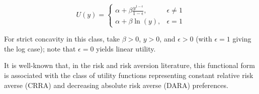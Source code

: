 \documentclass[Chp3.tex]{subfiles}
\begin{document}
\begin{equation}
U(y) = 
	\begin{cases}
	\alpha + \beta \frac{y^{1-\epsilon}}{1-\epsilon}, & \epsilon \neq 1\\
	\alpha + \beta \ln(y), & \epsilon =1
	\end{cases}
\end{equation}

\par For strict concavity in this class, take $\beta>0$, $y>0$, and $\epsilon>0$ (with $\epsilon=1$ giving the log case); note that $\epsilon=0$ yields linear utility.

\par It is well-known that, in the risk and risk aversion literature, this functional form is associated with the class of utility functions representing constant relative risk averse (CRRA) and decreasing absolute risk averse (DARA) preferences.
\end{document}

